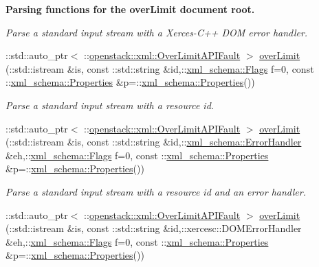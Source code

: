 \begin{Indent}{\bf Parsing functions for the overLimit document root.}
\begin{DoxyCompactItemize}
\begin{DoxyCompactList}\small\item\em Parse a standard input stream with a Xerces-\/C++ DOM error handler. \item\end{DoxyCompactList}\item 
::std::auto\_\-ptr$<$ ::\hyperlink{classopenstack_1_1xml_1_1OverLimitAPIFault}{openstack::xml::OverLimitAPIFault} $>$ \hyperlink{namespaceopenstack_1_1xml_a360effe72d5555417df2a02f117ce99a}{overLimit} (::std::istream \&is, const ::std::string \&id,::\hyperlink{namespacexml__schema_affb4c227cbd9aa7453dd1dc5a1401943}{xml\_\-schema::Flags} f=0, const ::\hyperlink{namespacexml__schema_ad27ce19a7ee1d3b1064092648898f64c}{xml\_\-schema::Properties} \&p=::\hyperlink{namespacexml__schema_ad27ce19a7ee1d3b1064092648898f64c}{xml\_\-schema::Properties}())
\begin{DoxyCompactList}\small\item\em Parse a standard input stream with a resource id. \item\end{DoxyCompactList}\item 
::std::auto\_\-ptr$<$ ::\hyperlink{classopenstack_1_1xml_1_1OverLimitAPIFault}{openstack::xml::OverLimitAPIFault} $>$ \hyperlink{namespaceopenstack_1_1xml_aa381293280d8473cc08a6de5d22c2f72}{overLimit} (::std::istream \&is, const ::std::string \&id,::\hyperlink{namespacexml__schema_ab1c9361bfd3b404eaabf0c31eded79dc}{xml\_\-schema::ErrorHandler} \&eh,::\hyperlink{namespacexml__schema_affb4c227cbd9aa7453dd1dc5a1401943}{xml\_\-schema::Flags} f=0, const ::\hyperlink{namespacexml__schema_ad27ce19a7ee1d3b1064092648898f64c}{xml\_\-schema::Properties} \&p=::\hyperlink{namespacexml__schema_ad27ce19a7ee1d3b1064092648898f64c}{xml\_\-schema::Properties}())
\begin{DoxyCompactList}\small\item\em Parse a standard input stream with a resource id and an error handler. \item\end{DoxyCompactList}\item 
::std::auto\_\-ptr$<$ ::\hyperlink{classopenstack_1_1xml_1_1OverLimitAPIFault}{openstack::xml::OverLimitAPIFault} $>$ \hyperlink{namespaceopenstack_1_1xml_a1823d126d31c74a0ff4526c29c240762}{overLimit} (::std::istream \&is, const ::std::string \&id,::xercesc::DOMErrorHandler \&eh,::\hyperlink{namespacexml__schema_affb4c227cbd9aa7453dd1dc5a1401943}{xml\_\-schema::Flags} f=0, const ::\hyperlink{namespacexml__schema_ad27ce19a7ee1d3b1064092648898f64c}{xml\_\-schema::Properties} \&p=::\hyperlink{namespacexml__schema_ad27ce19a7ee1d3b1064092648898f64c}{xml\_\-schema::Properties}())

\end{DoxyCompactItemize}
\end{Indent}
